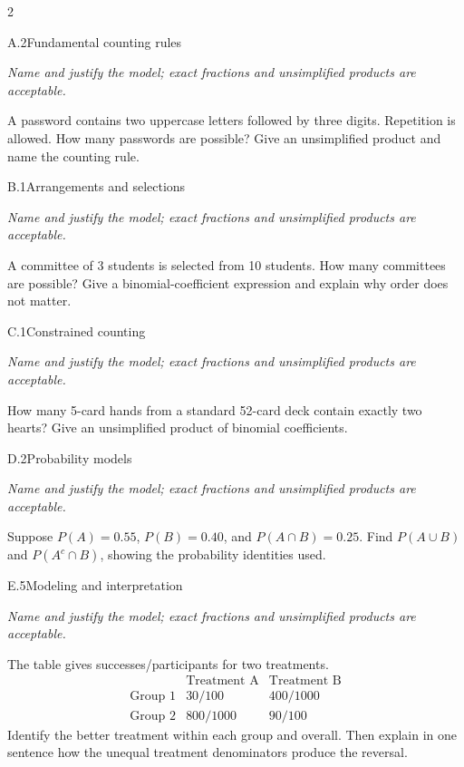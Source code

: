 \documentclass[9pt]{extarticle}
\begin{document}
\CoreWorkArea
\FormBreak
{}
\begin{multicols}{2}
\begin{CoreProblem}{A.2}{Fundamental counting rules}
{\scriptsize\textit{Name and justify the model; exact fractions and unsimplified products are acceptable.}\par}
A password contains two uppercase letters followed by three digits.
    Repetition is allowed. How many passwords are possible? Give an unsimplified
    product and name the counting rule.
\end{CoreProblem}
\begin{CoreProblem}{B.1}{Arrangements and selections}
{\scriptsize\textit{Name and justify the model; exact fractions and unsimplified products are acceptable.}\par}
A committee of 3 students is selected from 10 students. How many
    committees are possible? Give a binomial-coefficient expression and explain
    why order does not matter.
\end{CoreProblem}
\begin{CoreProblem}{C.1}{Constrained counting}
{\scriptsize\textit{Name and justify the model; exact fractions and unsimplified products are acceptable.}\par}
How many 5-card hands from a standard 52-card deck contain exactly
    two hearts? Give an unsimplified product of binomial coefficients.
\end{CoreProblem}
\columnbreak
\begin{CoreProblem}{D.2}{Probability models}
{\scriptsize\textit{Name and justify the model; exact fractions and unsimplified products are acceptable.}\par}
Suppose $P(A)=0.55$, $P(B)=0.40$, and $P(A\cap B)=0.25$. Find
    $P(A\cup B)$ and $P(A^c\cap B)$, showing the probability identities used.
\end{CoreProblem}
\begin{CoreProblem}{E.5}{Modeling and interpretation}
{\scriptsize\textit{Name and justify the model; exact fractions and unsimplified products are acceptable.}\par}
The table gives successes/participants for two treatments.
    \[
    \begin{array}{c|cc}
      &\text{Treatment A}&\text{Treatment B}\\\hline
      \text{Group 1}&30/100&400/1000\\
      \text{Group 2}&800/1000&90/100
    \end{array}
    \]
    Identify the better treatment within each group and overall. Then explain in
    one sentence how the unequal treatment denominators produce the reversal.
\end{CoreProblem}
\end{multicols}
\end{document}
